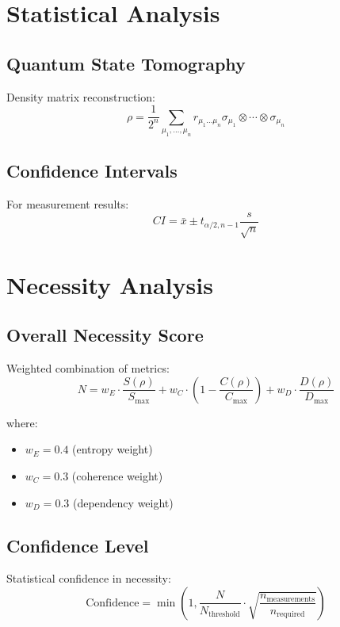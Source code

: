 \documentclass[12pt]{article}
\begin{document}
\section{Statistical Analysis}

\subsection{Quantum State Tomography}
Density matrix reconstruction:
\begin{equation}
    \rho = \frac{1}{2^n}\sum_{\mu_1,\ldots,\mu_n} r_{\mu_1\ldots\mu_n}\sigma_{\mu_1}\otimes\cdots\otimes\sigma_{\mu_n}
\end{equation}

\subsection{Confidence Intervals}
For measurement results:
\begin{equation}
    CI = \bar{x} \pm t_{\alpha/2,n-1}\frac{s}{\sqrt{n}}
\end{equation}

\section{Necessity Analysis}

\subsection{Overall Necessity Score}
Weighted combination of metrics:
\begin{equation}
    N = w_E\cdot\frac{S(\rho)}{S_{\text{max}}} + w_C\cdot(1-\frac{C(\rho)}{C_{\text{max}}}) + w_D\cdot\frac{D(\rho)}{D_{\text{max}}}
\end{equation}

where:
\begin{itemize}
    \item $w_E = 0.4$ (entropy weight)
    \item $w_C = 0.3$ (coherence weight)
    \item $w_D = 0.3$ (dependency weight)
\end{itemize}

\subsection{Confidence Level}
Statistical confidence in necessity:
\begin{equation}
    \text{Confidence} = \min\left(1, \frac{N}{N_{\text{threshold}}}\cdot\sqrt{\frac{n_{\text{measurements}}}{n_{\text{required}}}}\right)
\end{equation}
\end{document}
